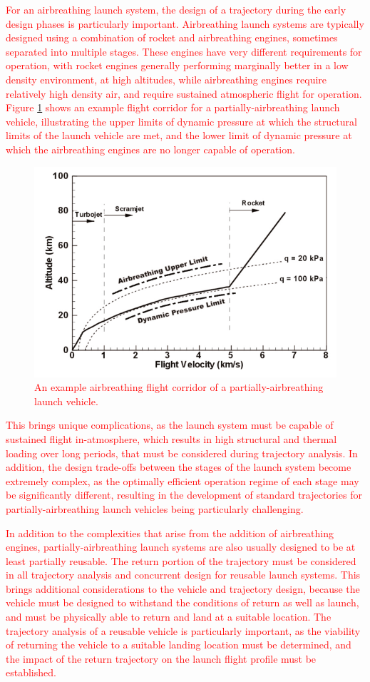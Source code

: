\textcolor{red}{
For an airbreathing launch system, the design of a trajectory during the early design phases is particularly important. Airbreathing launch systems are typically designed using a combination of rocket and airbreathing engines, sometimes separated into multiple stages. These engines have very different requirements for operation, with rocket engines generally performing marginally better in a low density environment, at high altitudes, while airbreathing engines require relatively high density air, and require sustained atmospheric flight for operation. Figure \ref{fig:FlightCorridor} shows an example flight corridor for a partially-airbreathing launch vehicle, illustrating the upper limits of dynamic pressure at which the structural limits of the launch vehicle are met, and the lower limit of dynamic pressure at which the airbreathing engines are no longer capable of operation. 
\begin{figure}[ht]
\centering
\includegraphics[width=0.7\linewidth]{figures/2_literature-review/FlightCorridor}
\caption{An example airbreathing flight corridor of a partially-airbreathing launch vehicle.}
\label{fig:FlightCorridor}
\end{figure}
This brings unique complications, as the launch system must be capable of sustained flight in-atmosphere, which results in high structural and thermal loading over long periods, that must be considered during trajectory analysis. In addition, the design trade-offs between the stages of the launch system become extremely complex, as the optimally efficient operation regime of each stage may be significantly different, resulting in the development of standard trajectories for partially-airbreathing launch vehicles being particularly challenging. 
}

\textcolor{red}{
	In addition to the complexities that arise from the addition of airbreathing engines, partially-airbreathing launch systems are also usually designed to be at least partially reusable. The return portion of the trajectory must be considered in all trajectory analysis and concurrent design for reusable launch systems. This brings additional considerations to the vehicle and trajectory design, because the vehicle must be designed to withstand the conditions of return as well as launch, and must be physically able to return and land at a suitable location. The trajectory analysis of a reusable vehicle is particularly important, as the viability of returning the vehicle to a suitable landing location must be determined, and the impact of the return trajectory on the launch flight profile must be established. 
}

